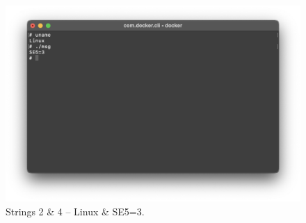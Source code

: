 \documentclass[12pt]{article}
\begin{document}
\begin{figure}[!ht]
    \centering
    \includegraphics[width=\textwidth]{figure02.png}\vspace{-2em}
    \caption{Strings 2 \& 4 -- Linux \& SE5=3.}
    \label{fig:string2}
\end{figure}



\end{document}
